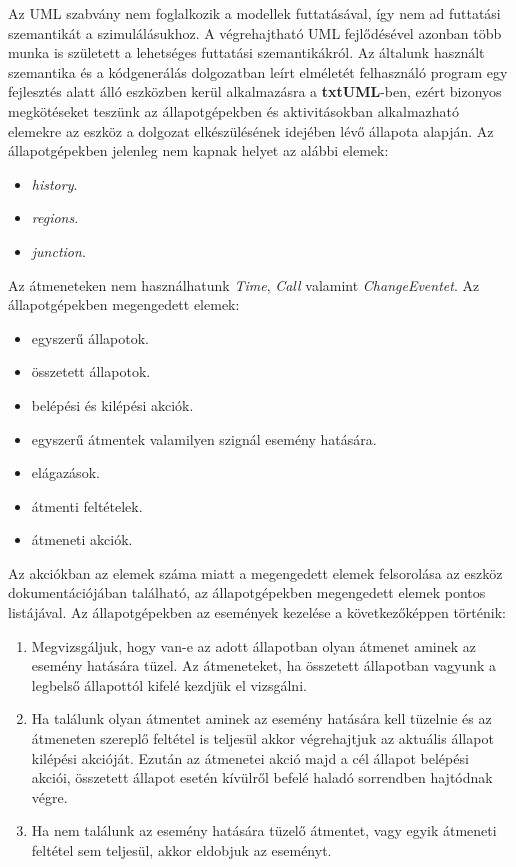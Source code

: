 \documentclass[a4paper,12pt]{report}
\begin{document}
Az UML szabvány nem foglalkozik a modellek futtatásával, így nem ad futtatási szemantikát a szimulálásukhoz. A végrehajtható UML fejlődésével azonban több munka is született a lehetséges futtatási szemantikákról\cite{storrle2004semantics,mellor2002executable,harel2004rhapsody,von2002structured}.
Az általunk használt szemantika és a kódgenerálás dolgozatban leírt elméletét felhasználó program egy fejlesztés alatt álló eszközben kerül alkalmazásra a {\bf txtUML}\cite{txtuml}-ben, ezért bizonyos megkötéseket teszünk az állapotgépekben és aktivitásokban alkalmazható elemekre az eszköz a dolgozat elkészülésének idejében lévő állapota alapján. Az állapotgépekben jelenleg nem kapnak helyet az alábbi elemek:
\begin{itemize}
\item {\it history}.
\item {\it regions}.
\item {\it junction}.
\end{itemize} 
Az átmeneteken nem használhatunk {\it Time}, {\it Call} valamint {\it ChangeEventet}.
Az állapotgépekben megengedett elemek:
\begin{itemize}
\item egyszerű állapotok.
\item összetett állapotok.
\item belépési és kilépési akciók.
\item egyszerű átmentek valamilyen szignál esemény hatására.
\item elágazások.
\item átmenti feltételek.
\item átmeneti akciók.
\end{itemize}
Az akciókban az elemek száma miatt a megengedett elemek felsorolása az eszköz dokumentációjában található, az állapotgépekben megengedett elemek pontos listájával.
Az állapotgépekben az események kezelése a következőképpen történik:
\begin{enumerate}
\item Megvizsgáljuk, hogy van-e az adott állapotban olyan átmenet aminek az esemény hatására tüzel. Az átmeneteket, ha összetett állapotban vagyunk a legbelső állapottól kifelé kezdjük el vizsgálni.
\item Ha találunk olyan átmentet aminek az esemény hatására kell tüzelnie és az átmeneten szereplő feltétel is teljesül akkor végrehajtjuk az aktuális állapot kilépési akcióját. Ezután az átmenetei akció majd a cél állapot belépési akciói, összetett állapot esetén kívülről befelé haladó sorrendben hajtódnak végre.
\item Ha nem találunk az esemény hatására tüzelő átmentet, vagy egyik átmeneti feltétel sem teljesül, akkor eldobjuk az eseményt.
\end{enumerate}
\end{document}
